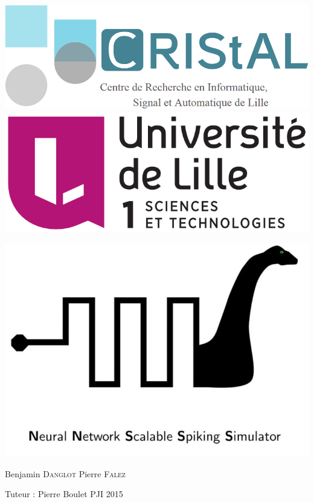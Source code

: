 \documentclass{article}
\begin{document}

\includegraphics[scale=0.1]{image/cristal.png}
\hfill
\includegraphics[scale=0.1]{image/lille1.png}

\vspace*{4cm}

\includegraphics[scale=0.4]{image/n2s3.jpg}

\vfill
{\LARGE
\noindent
	Benjamin \textsc{Danglot}\newline
	Pierre \textsc{Falez}
}

\vfill
{
\noindent
{\LARGE Tuteur : Pierre Boulet} \hfill PJI 2015 
}

\newpage

\end{document}
